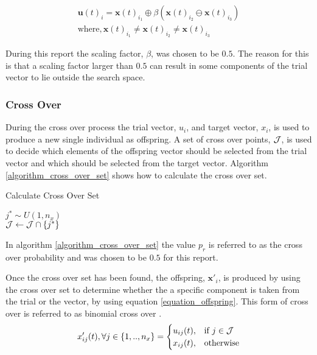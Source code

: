 \documentclass[hidelinks,english,conference]{IEEEtran}
\begin{document}
			\begin{equation}
				\begin{split}
				\textbf{u}(t)_i = \textbf{x}(t)_{i_1}  \oplus \beta(\textbf{x}(t)_{i_2} \ominus \textbf{x}(t)_{i_3})\\ 
				\text{where}, \textbf{x}(t)_{i_1} \neq \textbf{x}(t)_{i_2} \neq \textbf{x}(t)_{i_3}
				\end{split}
				\label{equation_trial_calculation}
			\end{equation}
			
		During this report the scaling factor, $\beta$, was chosen to be $0.5$. The reason for this is that a scaling factor larger than $0.5$ can result in some components of the trial vector to lie outside the search space.
		
		\subsubsection{Cross Over}\label{section_cross_over}
			During the cross over process the trial vector, $u_i$, and target vector, $x_i$, is used to produce a new single individual as offspring. A set of cross over points, $\CMcal{J}$, is used to decide which elements of the offspring vector should be selected from the trial vector and which should be selected from the target vector. Algorithm \ref{algorithm_cross_over_set} \cite{engelbrecht2007computational} shows how to calculate the cross over set.
		   \begin{algorithm}
				\SetAlgoLined
				\caption{Calculate Cross Over Set}\label{algorithm_cross_over_set}
				$j^* \sim U(1,n_x)$\\
				$\CMcal{J} \leftarrow \CMcal{J} \cap \lbrace j^* \rbrace$\\
				
			\end{algorithm}
		
		In algorithm \ref{algorithm_cross_over_set} the value $p_r$ is referred to as the cross over probability and was chosen to be $0.5$ for this report.

	Once the cross over set has been found, the offspring, $\textbf{x}'_i$, is produced by using the cross over set to determine whether the a specific component is taken from the trial or the vector, by using equation \ref{equation_offspring}. This form of cross over is referred to as binomial cross over \cite{engelbrecht2007computational}.
    \begin{align}\label{equation_offspring}
    	x'_{ij}(t), \forall j \in \lbrace 1,..,n_x \rbrace = 
        \begin{cases}
          u_{ij}(t), & \text{if } j \in \CMcal{J}\\
          x_{ij}(t), & \text{otherwise}
        \end{cases}
	\end{align}
\end{document}
